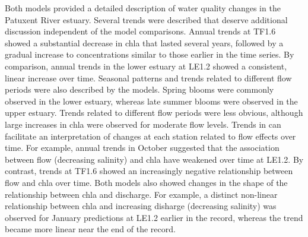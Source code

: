 \documentclass[letterpaper,12pt,oneside]{article}\usepackage[]{graphicx}\usepackage[]{color}
\begin{document}
Both models provided a detailed description of water quality changes in the Patuxent River estuary.  Several trends were described that deserve additional discussion independent of the model comparisons.  Annual trends at TF1.6 showed a substantial decrease in \ac{chla} that lasted several years, followed by a gradual increase to concentrations similar to those earlier in the time series.  By comparison, annual trends in the lower estuary at LE1.2 showed a consistent, linear increase over time.  Seasonal patterns and trends related to different flow periods were also described by the models.  Spring blooms were commonly observed in the lower estuary, whereas late summer blooms were observed in the upper estuary.  Trends related to different flow periods were less obvious, although large increases in \ac{chla} were observed for moderate flow levels.  Trends in  can facilitate an interpretation of changes at each station related to flow effects over time.  For example, annual trends in October suggested that the association between flow (decreasing salinity) and \ac{chla} have weakened over time at LE1.2.  By contrast, trends at TF1.6 showed an increasingly negative relationship between flow and \ac{chla} over time.  Both models also showed changes in the shape of the relationship between \ac{chla} and discharge.  For example, a distinct non-linear relationship between \ac{chla} and increasing disharge (decreasing salinity) was observed for January predictions at LE1.2 earlier in the record, whereas the trend became more linear near the end of the record.
\end{document}
